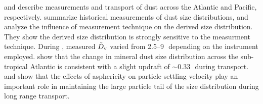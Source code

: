 \documentclass[12pt,twoside]{article}
\begin{document}
\cite{PCE97} and \cite{PeC99} describe measurements and transport of
dust across the Atlantic and Pacific, respectively.
\cite{RJM03} summarize historical measurements of dust size
distributions, and analyze the influence of measurement technique on
the derived size distribution.
They show the derived size distribution is strongly sensitive
to the measurment technique.
During , measured $\tilde{D}_{\mathrm{v}}$ varied from 2.5--9\,\um\ 
depending on the instrument employed.
\cite{MSI03} show that the change in mineral dust size distribution
across the sub-tropical Atlantic is consistent with a slight updraft
of $\sim 0.33$\,\cmxs\ during transport.
\cite{Gin03} and \cite{CTH03} show that the effects of asphericity on
particle settling velocity play an important role in maintaining the
large particle tail of the size distribution during long range
transport. 
\end{document}
